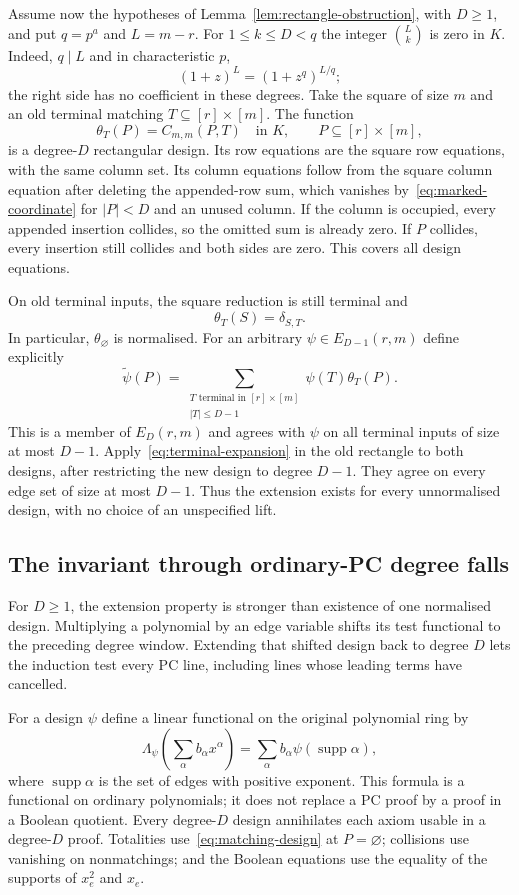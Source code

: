 Assume now the hypotheses of Lemma~\ref{lem:rectangle-obstruction}, with
$D\geq1$, and put $q=p^a$ and $L=m-r$.  For $1\leq k\leq D<q$ the
integer $\binom{L}{k}$ is zero in $K$.  Indeed, $q\mid L$ and in
characteristic $p$,
\[
 (1+z)^L=(1+z^q)^{L/q};
\]
the right side has no coefficient in these degrees.  Take the square
of size $m$ and an old terminal matching $T\subseteq[r]\times[m]$.
The function
\[
 \theta_T(P)=C_{m,m}(P,T)\quad\text{in }K,
       \qquad P\subseteq[r]\times[m],
\]
is a degree-$D$ rectangular design.  Its row equations are the square
row equations, with the same column set.  Its column equations follow
from the square column equation after deleting the appended-row sum,
which vanishes by~\eqref{eq:marked-coordinate} for $|P|<D$ and an
unused column.  If the column is occupied, every appended insertion
collides, so the omitted sum is already zero.  If $P$ collides, every
insertion still collides and both sides are zero.  This covers all
design equations.

On old terminal inputs, the square reduction is still terminal and
\[
 \theta_T(S)=\delta_{S,T}.
\]
In particular, $\theta_{\varnothing}$ is normalised.  For an arbitrary
$\psi\in E_{D-1}(r,m)$ define explicitly
\[
 \widetilde\psi(P)=
    \sum_{\substack{T\text{ terminal in }[r]\times[m]\\|T|\leq D-1}}
                     \psi(T)\theta_T(P).
\]
This is a member of $E_D(r,m)$ and agrees with $\psi$ on all terminal
inputs of size at most $D-1$.  Apply~\eqref{eq:terminal-expansion} in the
old rectangle to both designs, after restricting the new design to
degree $D-1$.  They agree on every edge set of size at most $D-1$.
Thus the extension exists for every unnormalised design, with no
choice of an unspecified lift.

\subsection{The invariant through ordinary-PC degree falls}
For $D\ge1$, the extension property is stronger than existence of one normalised
design. Multiplying a polynomial by an edge variable shifts its test
functional to the preceding degree window. Extending that shifted
design back to degree $D$ lets the induction test every PC line,
including lines whose leading terms have cancelled.

For a design $\psi$ define a linear functional on the original polynomial
ring by
\[
 \Lambda_\psi\!\left(\sum_\alpha b_\alpha x^\alpha\right)
      =\sum_\alpha b_\alpha\psi(\operatorname{supp}\alpha),
\]
where $\operatorname{supp}\alpha$ is the set of edges with positive
exponent.  This formula is a functional on ordinary polynomials; it
does not replace a PC proof by a proof in a Boolean quotient.
Every degree-$D$ design annihilates each axiom usable in a degree-$D$
proof.  Totalities use~\eqref{eq:matching-design} at $P=\varnothing$;
collisions use vanishing on nonmatchings; and the Boolean equations
use the equality of the supports of $x_e^2$ and $x_e$.

